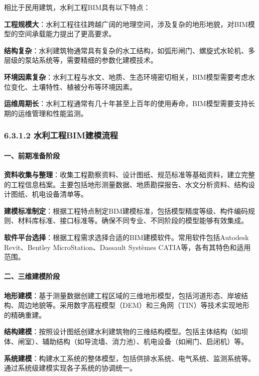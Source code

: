 相比于民用建筑，水利工程BIM具有以下特点：

\textbf{工程规模大}：水利工程往往跨越广阔的地理空间，涉及复杂的地形地貌，对BIM模型的空间承载能力提出了更高要求。

\textbf{结构复杂}：水利建筑物通常具有复杂的水工结构，如弧形闸门、螺旋式水轮机、多层级的泵站系统等，需要精细的参数化建模技术。

\textbf{环境因素复杂}：水利工程与水文、地质、生态环境密切相关，BIM模型需要考虑水位变化、土壤特性、植被分布等环境因素。

\textbf{运维周期长}：水利工程通常有几十年甚至上百年的使用寿命，BIM模型需要支持长期的运维管理和性能监测。

\subsubsection{6.3.1.2
水利工程BIM建模流程}\label{ux6c34ux5229ux5de5ux7a0bbimux5efaux6a21ux6d41ux7a0b}

\paragraph{一、前期准备阶段}\label{ux4e00ux524dux671fux51c6ux5907ux9636ux6bb5}

\textbf{资料收集与整理}：收集工程勘察资料、设计图纸、规范标准等基础资料，建立完整的工程信息档案。主要包括地形测量数据、地质勘探报告、水文分析资料、结构设计图纸、机电设备清单等。

\textbf{建模标准制定}：根据工程特点制定BIM建模标准，包括模型精度等级、构件编码规则、材料库标准、接口标准等。确保不同专业、不同阶段的模型能够有效集成。

\textbf{软件平台选择}：根据工程需求选择合适的BIM建模软件。常用软件包括Autodesk
Revit、Bentley MicroStation、Dassault Systèmes
CATIA等，各有其特色和适用范围。

\paragraph{二、三维建模阶段}\label{ux4e8cux4e09ux7ef4ux5efaux6a21ux9636ux6bb5}

\textbf{地形建模}：基于测量数据创建工程区域的三维地形模型，包括河道形态、岸坡结构、周边地貌等。采用数字高程模型（DEM）和三角网（TIN）等技术实现地形的精确重建。

\textbf{结构建模}：按照设计图纸创建水利建筑物的三维结构模型。包括主体结构（如坝体、闸室）、辅助结构（如导流墙、消力池）、机电设备（如闸门、启闭机）等。

\textbf{系统建模}：构建水工系统的整体模型，包括供排水系统、电气系统、监测系统等。通过系统级建模实现各子系统的协调统一。

